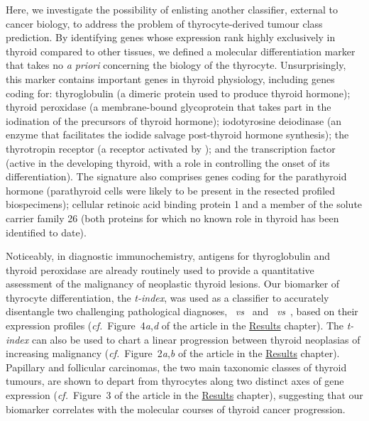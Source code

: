 Here, we investigate the possibility of enlisting another classifier, external
to cancer biology, to address the problem of thyrocyte-derived tumour class
prediction.  By identifying genes whose expression rank highly exclusively in
thyroid compared to other tissues, we defined a molecular differentiation marker
that takes no \emph{a priori} concerning the biology of the thyrocyte.
Unsurprisingly, this marker contains important genes in thyroid physiology,
including genes coding for: thyroglobulin (a dimeric protein used to produce
thyroid hormone); thyroid peroxidase (a membrane-bound glycoprotein that takes
part in the iodination of the precursors of thyroid hormone); iodotyrosine
deiodinase (an enzyme that facilitates the iodide salvage post-thyroid hormone
synthesis); the thyrotropin receptor (a receptor activated by );
and the  transcription factor (active in the developing thyroid,
with a role in controlling the onset of its
differentiation\cite{zannini_ttf-2_1997}).  The signature also comprises genes
coding for the parathyroid hormone (parathyroid cells were likely to be present
in the resected profiled biospecimens); cellular retinoic acid binding protein 1
and a member of the solute carrier family 26 (both proteins for which no known
role in thyroid has been identified to date).

Noticeably, in diagnostic immunochemistry, antigens for thyroglobulin and
thyroid peroxidase are already routinely used to provide a quantitative
assessment of the malignancy of neoplastic thyroid
lesions.\cite{tanaka_immunohistochemical_1996,gerard_correlation_2003} Our
biomarker of thyrocyte differentiation, the \emph{t-index}, was used as a
classifier to accurately disentangle two challenging pathological diagnoses,
\mbox{ \emph{vs} } and \mbox{
  \emph{vs} }, based on their expression profiles
(\mbox{\emph{cf.}  Figure~4\emph{a},\emph{d}} of the article in the
\hyperref[chap:results]{\textsf{Results}} chapter).  The \emph{t-index} can also
be used to chart a linear progression between thyroid neoplasias of increasing
malignancy (\mbox{\emph{cf.}  Figure~2\emph{a},\emph{b}} of the article in the
\hyperref[chap:results]{\textsf{Results}} chapter).  Papillary and follicular
carcinomas, the two main taxonomic classes of thyroid tumours, are shown to
depart from thyrocytes along two distinct axes of gene expression
(\mbox{\emph{cf.} Figure~3} of the article in the
\hyperref[chap:results]{\textsf{Results}} chapter), suggesting that our
biomarker correlates with the molecular courses of thyroid cancer progression.

